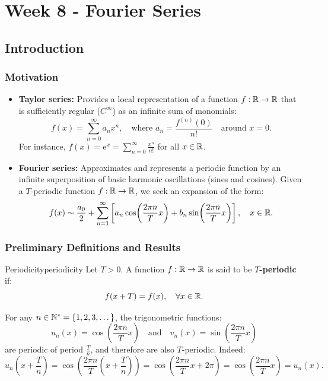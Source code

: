 \chapter{Week 8 - Fourier Series}

\section{Introduction}

\subsection{Motivation}

\begin{itemize}
    \item \textbf{Taylor series:} Provides a local representation of a function $f: \mathbb{R} \to \mathbb{R}$ that is sufficiently regular ($C^\infty$) as an infinite sum of monomials:
    \[
    f(x) = \sum_{n=0}^\infty a_n x^n, \quad \text{where } a_n = \frac{f^{(n)}(0)}{n!} \quad \text{around } x = 0.
    \]
    For instance, $f(x) = \mathrm{e}^x = \sum_{n=0}^\infty \frac{x^n}{n!}$ for all $x \in \mathbb{R}$.
    
    \item \textbf{Fourier series:} Approximates and represents a periodic function by an infinite superposition of basic harmonic oscillations (sines and cosines). Given a $T$-periodic function $f: \mathbb{R} \to \mathbb{R}$, we seek an expansion of the form:
    \[
    f(x) \sim \frac{a_0}{2} + \sum_{n=1}^\infty \left[ a_n \cos\!\left(\frac{2\pi n}{T} x\right) + b_n \sin\!\left(\frac{2\pi n}{T} x\right) \right], \quad x \in \mathbb{R}.
    \]
\end{itemize}

\subsection{Preliminary Definitions and Results}

\begin{definition}{Periodicity}{periodicity}
Let $T > 0$. A function $f: \mathbb{R} \to \mathbb{R}$ is said to be \textbf{$T$-periodic} if:
\[
f(x + T) = f(x), \quad \forall x \in \mathbb{R}.
\]
\end{definition}

\begin{exemple}
For any $n \in \mathbb{N}^* = \{1, 2, 3, \dots\}$, the trigonometric functions:
\[
u_n(x) = \cos\!\left(\frac{2\pi n}{T} x\right) \quad \text{and} \quad v_n(x) = \sin\!\left(\frac{2\pi n}{T} x\right)
\]
are periodic of period $\frac{T}{n}$, and therefore are also $T$-periodic. Indeed:
\[
u_n\!\left(x + \frac{T}{n}\right) = \cos\!\left(\frac{2\pi n}{T}\left(x + \frac{T}{n}\right)\right) = \cos\!\left(\frac{2\pi n}{T} x + 2\pi\right) = \cos\!\left(\frac{2\pi n}{T} x\right) = u_n(x).
\]
\end{exemple}

